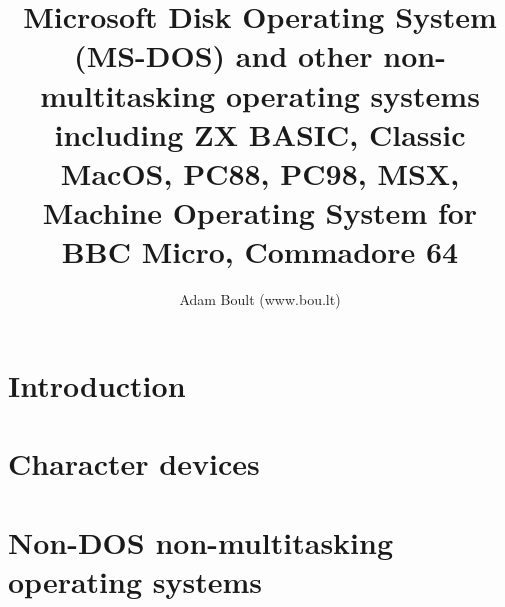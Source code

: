 \documentclass[oneside]{book}
\begin{document}
\author{Adam Boult (www.bou.lt)}
\title{Microsoft Disk Operating System (MS-DOS) and other non-multitasking operating systems including ZX BASIC, Classic MacOS, PC88, PC98, MSX, Machine Operating System for BBC Micro, Commadore 64}
\maketitle

\setcounter{tocdepth}{0}
\tableofcontents



\part{Introduction}

\part{Character devices}


\part{Non-DOS non-multitasking operating systems}
\end{document}
